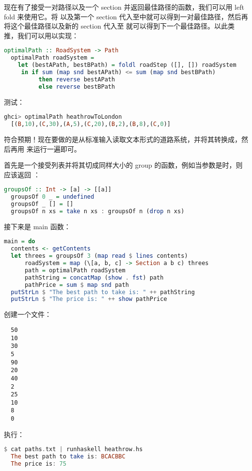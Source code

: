 \documentclass[./main.tex]{subfiles}
\begin{document}
现在有了接受一对路径以及一个 section 并返回最佳路径的函数，我们可以用 left fold 来使用它。将\acode{([],[])}
以及第一个 section 代入至中就可以得到一对最佳路径，然后再将这个最佳路径以及新的 section 代入至
就可以得到下一个最佳路径。以此类推，我们可以用以实现：

\begin{lstlisting}[language=Haskell]
  optimalPath :: RoadSystem -> Path
  optimalPath roadSystem =
    let (bestAPath, bestBPath) = foldl roadStep ([], []) roadSystem
     in if sum (map snd bestAPath) <= sum (map snd bestBPath)
          then reverse bestAPath
          else reverse bestBPath
\end{lstlisting}

测试：

\begin{lstlisting}[language=Haskell]
  ghci> optimalPath heathrowToLondon
  [(B,10),(C,30),(A,5),(C,20),(B,2),(B,8),(C,0)]
\end{lstlisting}

符合预期！现在要做的是从标准输入读取文本形式的道路系统，并将其转换成，然后再用
来运行一遍即可。

首先是一个接受列表并将其切成同样大小的 group 的函数，例如当参数是\acode{[1..10]}时，则应该返回
\acode{[[1,2,3],[4,5,6],[7,8,9],[10]]}：

\begin{lstlisting}[language=Haskell]
  groupsOf :: Int -> [a] -> [[a]]
  groupsOf 0 _ = undefined
  groupsOf _ [] = []
  groupsOf n xs = take n xs : groupsOf n (drop n xs)
\end{lstlisting}

接下来是 main 函数：

\begin{lstlisting}[language=Haskell]
  main = do
  contents <- getContents
  let threes = groupsOf 3 (map read $ lines contents)
      roadSystem = map (\[a, b, c] -> Section a b c) threes
      path = optimalPath roadSystem
      pathString = concatMap (show . fst) path
      pathPrice = sum $ map snd path
  putStrLn $ "The best path to take is: " ++ pathString
  putStrLn $ "The price is: " ++ show pathPrice
\end{lstlisting}

创建一个文件：

\begin{lstlisting}
  50
  10
  30
  5
  90
  20
  40
  2
  25
  10
  8
  0
\end{lstlisting}

执行：

\begin{lstlisting}[language=Haskell]
  $ cat paths.txt | runhaskell heathrow.hs
  The best path to take is: BCACBBC
  The price is: 75
\end{lstlisting}
\end{document}
